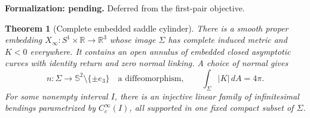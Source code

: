 \documentclass[11pt]{amsart}
\newtheorem{theorem}{Theorem}[section]
\theoremstyle{definition}
\theoremstyle{remark}
\newcommand{\R}{\mathbb R}\newcommand{\Sph}{\mathbb S}
\numberwithin{equation}{section}
\begin{document}
\par\noindent\textbf{Formalization: pending.} Deferred from the first-pair objective.\par
\begin{theorem}[Complete embedded saddle cylinder]\label{thm:complete-cylinder}
There is a smooth proper embedding $X_\infty:S^1\times\R\to\R^3$
whose image $\Sigma$ has complete induced metric and $K<0$ everywhere.
It contains an open annulus of embedded closed asymptotic curves with
identity return and zero normal linking. A choice of normal gives
\[
 n:\Sigma\longrightarrow\Sph^2\setminus\{\pm e_3\}
 \quad\text{a diffeomorphism},\qquad
 \int_\Sigma|K|\,dA=4\pi.
\]
For some nonempty interval $I$, there is an injective linear family of
infinitesimal bendings parametrized by $C_c^\infty(I)$, all supported in
one fixed compact subset of $\Sigma$.
\end{theorem}
\end{document}
